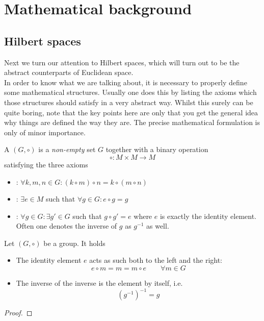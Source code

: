 \chapter{Mathematical background}

\section{Hilbert spaces}
Next we turn our attention to Hilbert spaces, which will turn out to be the abstract counterparts of Euclidean space. \\

In order to know what we are talking about, it is necessary to properly define some mathematical structures.
Usually one does this by listing the axioms which those structures should satisfy in a very abstract way.
Whilst this surely can be quite boring, note that the key points here are only that you get the general idea why things are defined the way they are. 
The precise mathematical formulation is only of minor importance.

\begin{defn}
	A  $(G, \circ)$ is a \emph{non-empty} set $G$
	together with a binary operation
	\[ \circ: M \times M \to M \]
	satisfying the three axioms
	\begin{itemize}
		\item {}: 
			$\forall k, m, n \in G: \left( k \circ m \right) \circ n = k \circ \left( m \circ n \right)$
		\item {}: $\exists e \in M$ such that $\forall g \in G:  e \circ g = g$
		\item {}:
			$\forall g \in G: \exists g' \in G$ such that $g \circ g' = e$
		where $e$ is exactly the identity element.
		Often one denotes the inverse of $g$ as $g^{-1}$ as well.
	\end{itemize}
\end{defn}

\begin{lem}
	Let $(G, \circ)$ be a group. It holds
	\begin{itemize}
		\item The identity element $e$ acts as such both to the left and the right:
			\[ e \circ m = m = m \circ e \qquad \forall m \in G \]
		\item The inverse of the inverse is the element by itself, i.e.
			\[ (g^{-1})^{-1} = g \]
	\end{itemize}
	\begin{proof}
	\end{proof}
\end{lem}

